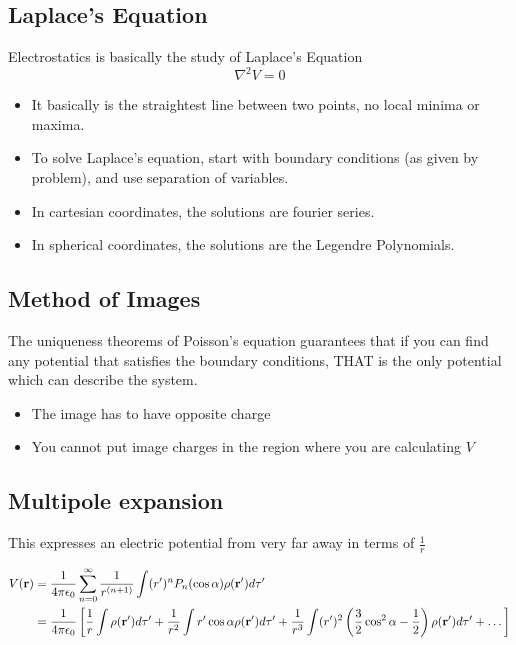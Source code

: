 \documentclass{article}
\newcommand{\ck}{\frac{1}{4\pi\epsilon_0}}
\begin{document}
\subsection{Laplace's Equation}
Electrostatics is basically the study of Laplace's Equation
$$
\nabla^2 V = 0
$$

\begin{itemize}
    \item It basically is the straightest line between two points, no local minima or maxima.
    \item To solve Laplace's equation, start with boundary conditions (as given by  problem), and use separation of variables.
    \item In cartesian coordinates, the solutions are fourier series.
    \item In spherical coordinates, the solutions are the Legendre Polynomials.
\end{itemize}

\subsection{Method of Images}
The uniqueness theorems of Poisson's equation guarantees that if you can find any potential that satisfies the boundary conditions, THAT is the only potential which can describe the system.

\begin{itemize}
\item The image has to have opposite charge
\item You cannot put image charges in the region where you are calculating $V$
\end{itemize}

\subsection{Multipole expansion}

This expresses an electric potential from very far away in terms of $\frac{1}{r}$

\begin{align*}
V(\vb{r}) & = \ck \sum_{n=0}^{\infty} \frac{1}{r^{(n+1)}} \int (r')^n P_n (\cos\alpha)\rho(\vb{r}') d\tau'\\
& = \ck \left[ \frac{1}{r} \int \rho(\vb{r}')d\tau' + \frac{1}{r^2} \int r' \cos \alpha \rho(\vb{r}') d\tau' + \frac{1}{r^3}\int(r')^2 \left(\frac{3}{2} \cos^2 \alpha - \frac{1}{2} \right) \rho(\vb{r}') d\tau' + \dots \right]
\end{align*}
\end{document}
